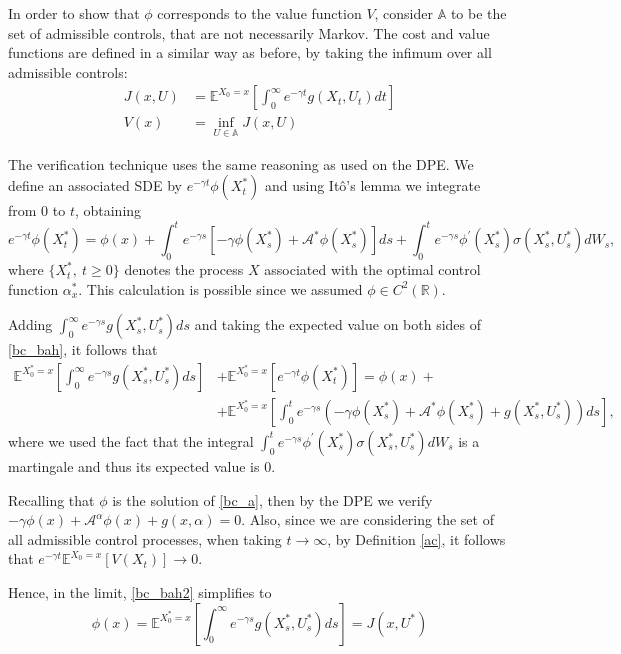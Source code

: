 In order to show that $\phi$ corresponds to the value function $V$, consider $\mathds{A}$ to be the set of admissible controls, that are not necessarily Markov. The cost and value functions are defined in a similar way as before, by taking the infimum over all admissible controls:
\begin{align*}
	J(x,U)&=\mathds{E}^{X_0=x} \left[ \int^\infty_0 e^{-\gamma t}g(X_t,U_t)dt\right]  \\
	V(x)&=\inf_{U \in \mathds{A}} J(x,U)
\end{align*}

The verification technique uses the same reasoning as used on the DPE. We define an associated SDE by $e^{-\gamma t}\phi(X_t^*)$ and using Itô's lemma we integrate from 0 to $t$, obtaining
\begin{equation}
e^{-\gamma t}\phi(X_t^*)=\phi(x)+\int^t_0 e^{-\gamma s}[-\gamma \phi(X_s^*)+\mathcal{A^*}\phi(X^*_s)] ds+\int^t_0 e^{-\gamma s} \phi^\prime(X^*_s)\sigma(X^*_s,U^*_s) dW_s,
\label{bc_bah}
\end{equation}
where $\{X_t^*, \ t \geq 0\}$ denotes the process $X$ associated with the optimal control function $\alpha^*_x$. This calculation is possible since we assumed $\phi \in C^2(\mathds{R})$.

Adding $\int^\infty_0 e^{-\gamma s}g(X_s^*,U_s^*)ds$ and taking the expected value on both sides of \eqref{bc_bah}, it follows that
\begin{align}
\mathds{E}^{X^*_0=x} \left[ \int^\infty_0 e^{-\gamma s}g(X_s^*,U_s^*)ds \right] &+ \mathds{E}^{X^*_0=x} \left[ e^{-\gamma t}\phi(X_t^*) \right]=
\phi(x) + \nonumber \\ 
&+\mathds{E}^{X^*_0=x} \left[ \int^t_0 e^{-\gamma s}(-\gamma \phi(X_s^*)+\mathcal{A^*}\phi(X^*_s)+g(X_s^*,U_s^*)) ds \right],
\label{bc_bah2}
\end{align}
where we used the fact that the integral $\int^t_0 e^{-\gamma s} \phi^\prime(X^*_s)\sigma(X^*_s,U^*_s) dW_s$ is a martingale and thus its expected value is 0.


Recalling that $\phi$ is the solution of \eqref{bc_a}, then by the DPE we verify $-\gamma \phi(x)+\mathcal{A}^\alpha \phi(x)+g(x,\alpha)=0$. Also, since we are considering the set of all admissible control processes, when taking $t \rightarrow \infty$, by Definition \ref{ac}, it follows that $e^{-\gamma t} \mathds{E}^{X_0=x}[V(X_t)] \rightarrow 0$.

Hence, in the limit, \eqref{bc_bah2} simplifies to
\begin{equation}
	\phi(x)=\mathds{E}^{X^*_0=x} \left[ \int^\infty_0 e^{-\gamma s}g(X_s^*,U_s^*)ds \right]=J(x,U^*)
	\label{bc_bah3}
\end{equation}

